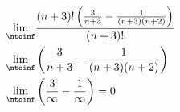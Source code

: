 
\begin{align}
    \lim_{\ntoinf} & \frac{(n + 3)! \left( \frac{3}{n + 3} - \frac{1}{(n + 3)(n + 2)} \right)}{(n + 3)!} \\
    \lim_{\ntoinf} & \left( \frac{3}{n + 3} - \frac{1}{(n + 3)(n + 2)} \right) \\
    \lim_{\ntoinf} & \left( \frac{3}{\infty} - \frac{1}{\infty} \right) = 0
\end{align}

\pagebreak
